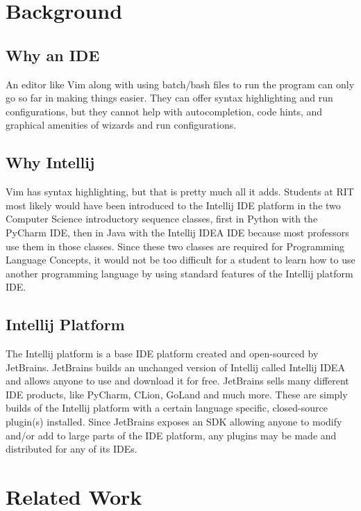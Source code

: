 \documentclass[conference, letterpaper]{IEEEtran}
\begin{document}
\section{Background}\label{sec:background}
\subsection{Why an IDE}\label{subsec:why-an-ide}
An editor like Vim along with using batch/bash files to run the program can only go so far in making things easier.
They can offer syntax highlighting and run configurations, but they cannot help with autocompletion, code hints, and graphical amenities of wizards and run configurations.

\subsection{Why Intellij}\label{subsec:why-intellij}
Vim has syntax highlighting, but that is pretty much all it adds.
Students at RIT most likely would have been introduced to the Intellij IDE platform in the two Computer Science introductory sequence classes, first in Python with the PyCharm IDE, then in Java with the Intellij IDEA IDE because most professors use them in those classes.
Since these two classes are required for Programming Language Concepts, it would not be too difficult for a student to learn how to use another programming language by using standard features of the Intellij platform IDE\@.

\subsection{Intellij Platform}\label{subsec:intellij-platform-sdk}
The Intellij platform is a base IDE platform created and open-sourced by JetBrains.
JetBrains builds an unchanged version of Intellij called Intellij IDEA and allows anyone to use and download it for free.
JetBrains sells many different IDE products, like PyCharm, CLion, GoLand and much more.
These are simply builds of the Intellij platform with a certain language specific, closed-source plugin(s) installed.
Since JetBrains exposes an SDK allowing anyone to modify and/or add to large parts of the IDE platform, any plugins may be made and distributed for any of its IDEs.


\section{Related Work}\label{sec:related-work}
\end{document}
